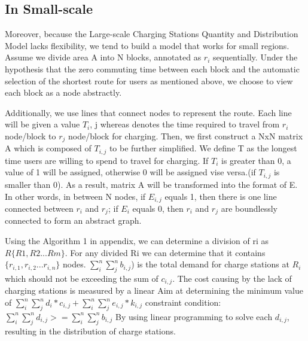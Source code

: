 \documentclass{mcmthesis}
\begin{document}
	\subsection{In Small-scale}
	Moreover, because the Large-scale Charging Stations Quantity and Distribution Model lacks flexibility, we tend to build a model that works for small regions.
Assume we divide area A into N blocks, annotated as $r_i$ sequentially. Under the hypothesis that the zero commuting time between each block and the automatic selection of the shortest route for users as mentioned above, we choose to view each block as a node abstractly. 
\par
Additionally, we use lines that connect nodes to represent the route. Each line will be given a value $T_i$, j whereas denotes the time required to travel from $r_i$ node/block to $r_j$ node/block for charging. Then, we first construct a NxN matrix A which is composed of $T_{i,j}$ to be further simplified. We define T as the longest time users are willing to spend to travel for charging. If $T_i$ is greater than 0, a value of 1 will be assigned, otherwise 0 will be assigned vise versa.(if $T_{i,j}$ is smaller than 0). As a result, matrix A will be transformed into the format of E. In other words, in between N nodes, if $E_{i,j}$ equals 1, then there is one line connected between $r_i$ and $r_j$; if $E_i$ equals 0, then $r_i$ and $r_j$ are boundlessly connected to form an abstract graph.

Using the Algorithm 1 in appendix, we can determine a division of ri as $R \{R1, R2 ... Rm\}$. For any divided Ri we can determine that it contains $\{r_{i,1}, r_{i,2} ... r_{i,n}\}$ nodes. $\sum_{i}^{n}\sum_{j}^{n}b_{i,j}$) is the total demand for charge stations at $R_i$ which should not be exceeding the sum of $c_{i,j}$. The cost causing by the lack of charging stations is measured by a linear 
Aim at determining the minimum value of $\sum_{i}^{n}\sum_{j}^{n}d_i*c_{i,j}+\sum_{i}^{n}\sum_{j}^{n}e_{i,j}*k_{i,j}$
constraint condition:$\sum_{i}^{n}\sum_{j}^{n}d_{i,j} >= \sum_{i}^{n}\sum_{j}^{n}{b_{i,j}}$
By using linear programming to solve each $d_{i,j}$, resulting in the distribution of charge stations.
\end{document}
